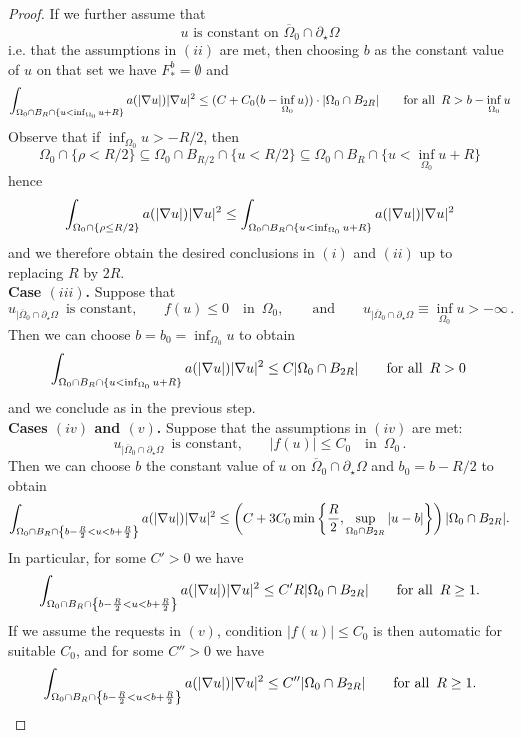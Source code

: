 \documentclass[10 pt,a4paper]{article}
\theoremstyle{definition}
\begin{document}
\begin{proof}
	If we further assume that
	\[
		u \text{ is constant on } \overline{\Omega}_0 \cap \partial_\star\Omega
	\]
	i.e. that the assumptions in $(ii)$ are met, then choosing $b$ as the constant value of $u$ on that set we have $F^b_\ast = \emptyset$ and
	\[
		\int_{\Omega_0 \cap B_R \cap \{u < \inf_{\Omega_0} u+R\}} a(|\nabla u|) |\nabla u|^2 \leq (C + C_0(b-\inf_{\Omega_0} u)) \cdot |\Omega_0 \cap B_{2R}| \qquad \text{for all } \, R > b-\inf_{\Omega_0} u
	\]
	Observe that if $\inf_{\Omega_0}u > -R/2$, then
	\[
		\Omega_0 \cap \{ \rho<R/2 \} \subseteq \Omega_0 \cap B_{R/2} \cap \{u<R/2\} \subseteq \Omega_0 \cap B_R \cap \{u<\inf_{\Omega_0} u + R\}
	\]
	hence
	\[
		\int_{\Omega_0 \cap \{\rho\leq R/2\}} a(|\nabla u|) |\nabla u|^2 \leq \int_{\Omega_0 \cap B_R \cap \{u < \inf_{\Omega_0} u+R\}} a(|\nabla u|) |\nabla u|^2
	\]
	and we therefore obtain the desired conclusions in $(i)$ and $(ii)$ up to replacing $R$ by $2R$. \\[0.2cm]
	\textbf{Case $(iii)$.} Suppose that
	\[
		u_{|\overline{\Omega}_0 \cap\partial_\star\Omega} \, \text{ is constant,} \qquad f(u) \leq 0 \quad \text{in } \, \Omega_0, \qquad \text{and} \qquad u_{|\overline{\Omega}_0 \cap\partial_\star\Omega} \equiv \inf_{\Omega_0} u > -\infty \, .
	\]
	Then we can choose $b = b_0 = \inf_{\Omega_0} u$ to obtain
	\[
		\int_{\Omega_0 \cap B_R \cap \{u < \inf_{\Omega_0} u+R\}} a(|\nabla u|) |\nabla u|^2 \leq C |\Omega_0 \cap B_{2R}| \qquad \text{for all } \, R>0 \, 
	\]
	and we conclude as in the previous step.\\[0.2cm]
	\textbf{Cases $(iv)$ and $(v)$.} Suppose that the assumptions in $(iv)$ are met:
	\[
		u_{|\overline{\Omega}_0 \cap \partial_\star\Omega} \, \text{ is constant,} \qquad |f(u)| \leq C_0 \quad \text{in } \, \Omega_0 \, .
	\]
	Then we can choose $b$ the constant value of $u$ on $\overline{\Omega}_0 \cap \partial_\star\Omega$ and $b_0 = b - R/2$ to obtain
	\[
		\int_{\Omega_0 \cap B_R \cap\left\{b - \frac{R}{2} < u < b + \frac{R}{2}\right\}} a(|\nabla u|) |\nabla u|^2 \leq \left( C + 3 C_0 \min\left\{ \frac{R}{2}, \sup_{\Omega_0\cap B_{2R}} |u-b| \right\}\right) |\Omega_0 \cap B_{2R}| .
	\]
	In particular, for some $C'>0$ we have
	\[
		\int_{\Omega_0 \cap B_R \cap \left\{b - \frac{R}{2} < u < b + \frac{R}{2}\right\}} a(|\nabla u|) |\nabla u|^2 \leq C' R |\Omega_0 \cap B_{2R}| \qquad \text{for all } \, R\geq 1.
	\]
	If we assume the requests in $(v)$, condition $|f(u)| \le C_0$ is then automatic for suitable $C_0$, and for some $C''>0$ we have
	\[
		\int_{\Omega_0 \cap B_R \cap \left\{b - \frac{R}{2} < u < b + \frac{R}{2}\right\}} a(|\nabla u|) |\nabla u|^2 \leq C'' |\Omega_0 \cap B_{2R}| \qquad \text{for all } \, R\ge 1.
\]
\end{proof}
\end{document}
